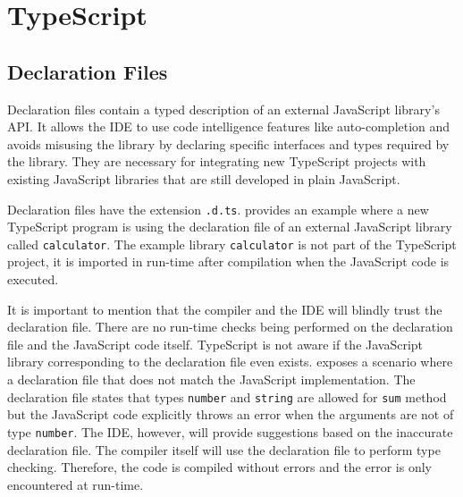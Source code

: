 \section{TypeScript} \label{sec:background-typescript}
\subsection{Declaration Files} \label{sec:declaration-files-background}
Declaration files contain a typed description of an external JavaScript library's API. It allows the IDE to use code intelligence features like auto-completion and avoids misusing the library by declaring specific interfaces and types required by the library. They are necessary for integrating new TypeScript projects with existing JavaScript libraries that are still developed in plain JavaScript.

Declaration files have the extension \texttt{.d.ts}.  provides an example where a new TypeScript program is using the declaration file of an external JavaScript library called \texttt{calculator}. The example  library \texttt{calculator} is not part of the TypeScript project, it is imported in run-time after compilation when the JavaScript code is executed.



It is important to mention that the compiler and the IDE will blindly trust the declaration file. There are no run-time checks being performed on the declaration file and the JavaScript code itself. TypeScript is not aware if the JavaScript library corresponding to the declaration file even exists.  exposes a scenario where a declaration file that does not match the JavaScript implementation. The declaration file states that types \texttt{number} and \texttt{string} are allowed for \texttt{sum} method but the JavaScript code explicitly throws an error when the arguments are not of type \texttt{number}. The IDE, however, will provide suggestions based on the inaccurate declaration file. The compiler itself will use the declaration file to perform type checking. Therefore, the code is compiled without errors and the error is only encountered at run-time.



